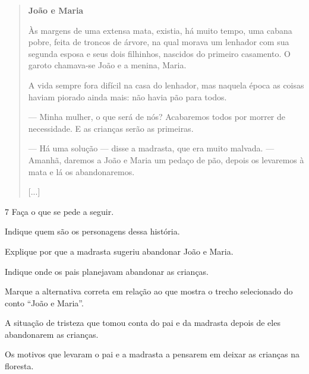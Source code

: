 \begin{quote}
\textbf{João e Maria}

Às margens de uma extensa mata, existia, há muito tempo, uma cabana
pobre, feita de troncos de árvore, na qual morava um lenhador com sua segunda esposa e
seus dois filhinhos, nascidos do primeiro casamento. O garoto chamava-se João e a
menina, Maria.

A vida sempre fora difícil na casa do lenhador, mas naquela época as
coisas haviam piorado ainda mais: não havia pão para todos.

--- Minha mulher, o que será de nós? Acabaremos todos por morrer
de necessidade. E as crianças serão as primeiras.

--- Há uma solução --- disse a madrasta, que era muito
malvada. --- Amanhã, daremos a João e Maria um pedaço de pão, depois os
levaremos à mata e lá os abandonaremos.

{[}...{]}

\end{quote}

\num{7} Faça o que se pede a seguir.

\begin{escolha}
\item Indique quem são os personagens dessa história.


\item Explique por que a madrasta sugeriu abandonar João e Maria.


\item Indique onde os pais planejavam abandonar as crianças.


\item Marque a alternativa correta em relação ao que mostra o trecho
selecionado do conto ``João e Maria''.

\begin{boxlist}
 A situação de tristeza que tomou conta do pai e da madrasta depois
de eles abandonarem as crianças.

 Os motivos que levaram o pai e a madrasta a pensarem em deixar as
crianças na floresta.
\end{boxlist}
\end{escolha}

